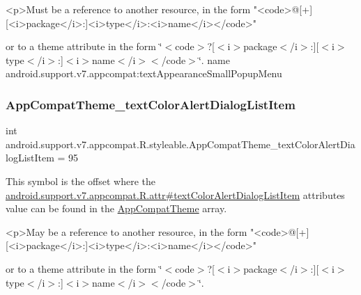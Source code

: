 \begin{DoxyVerb}      <p>Must be a reference to another resource, in the form "<code>@[+][<i>package</i>:]<i>type</i>:<i>name</i></code>"
\end{DoxyVerb}
 or to a theme attribute in the form \char`\"{}$<$code$>$?\mbox{[}$<$i$>$package$<$/i$>$\+:\mbox{]}\mbox{[}$<$i$>$type$<$/i$>$\+:\mbox{]}$<$i$>$name$<$/i$>$$<$/code$>$\char`\"{}.  name android.\+support.\+v7.\+appcompat\+:text\+Appearance\+Small\+Popup\+Menu \mbox{\label{classandroid_1_1support_1_1v7_1_1appcompat_1_1R_1_1styleable_a3c4e949776f711a5bd06b91184ceb404}} 
\subsubsection{\texorpdfstring{App\+Compat\+Theme\+\_\+text\+Color\+Alert\+Dialog\+List\+Item}{AppCompatTheme\_textColorAlertDialogListItem}}
{\footnotesize\ttfamily int android.\+support.\+v7.\+appcompat.\+R.\+styleable.\+App\+Compat\+Theme\+\_\+text\+Color\+Alert\+Dialog\+List\+Item = 95\hspace{0.3cm}{\ttfamily [static]}}

This symbol is the offset where the \hyperlink{classandroid_1_1support_1_1v7_1_1appcompat_1_1R_1_1attr_acf3e75d2d1ef8b122de63bc41fbd2edb}{android.\+support.\+v7.\+appcompat.\+R.\+attr\#text\+Color\+Alert\+Dialog\+List\+Item} attribute\textquotesingle{}s value can be found in the \hyperlink{classandroid_1_1support_1_1v7_1_1appcompat_1_1R_1_1styleable_a5c42f89e8a410c323be34208d75c430b}{App\+Compat\+Theme} array.

\begin{DoxyVerb}      <p>May be a reference to another resource, in the form "<code>@[+][<i>package</i>:]<i>type</i>:<i>name</i></code>"
\end{DoxyVerb}
 or to a theme attribute in the form \char`\"{}$<$code$>$?\mbox{[}$<$i$>$package$<$/i$>$\+:\mbox{]}\mbox{[}$<$i$>$type$<$/i$>$\+:\mbox{]}$<$i$>$name$<$/i$>$$<$/code$>$\char`\"{}. 

